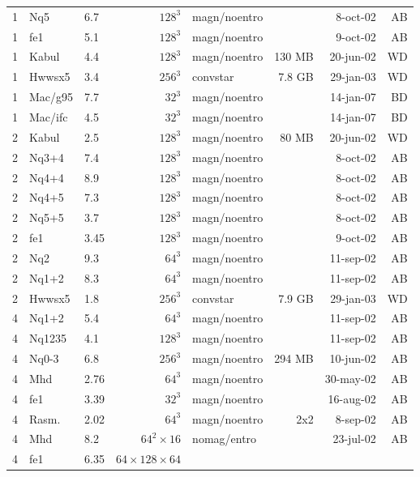 \documentclass[\mydriver,12pt,twoside,notitlepage,a4paper]{article}
\begin{document}
\begin{center}
\begin{small}
\begin{longtable}{rllrlrrr}
   1 & Nq5   & 6.7  & $128^3$ & magn/noentro &        &  8-oct-02 & AB \\
   1 & fe1   & 5.1  & $128^3$ & magn/noentro &        &  9-oct-02 & AB \\
   1 & Kabul & 4.4  & $128^3$ & magn/noentro & 130 MB & 20-jun-02 & WD \\
   1 & Hwwsx5& 3.4  & $256^3$ & convstar     & 7.8 GB & 29-jan-03 & WD \\
   1 &Mac/g95& 7.7  & $32^3$  & magn/noentro &        & 14-jan-07 & BD \\
   1 &Mac/ifc& 4.5  & $32^3$  & magn/noentro &        & 14-jan-07 & BD \\
   2 & Kabul & 2.5  & $128^3$ & magn/noentro &  80 MB & 20-jun-02 & WD \\
   2 & Nq3+4 & 7.4  & $128^3$ & magn/noentro &        &  8-oct-02 & AB \\
   2 & Nq4+4 & 8.9  & $128^3$ & magn/noentro &        &  8-oct-02 & AB \\
   2 & Nq4+5 & 7.3  & $128^3$ & magn/noentro &        &  8-oct-02 & AB \\
   2 & Nq5+5 & 3.7  & $128^3$ & magn/noentro &        &  8-oct-02 & AB \\
   2 & fe1   & 3.45 & $128^3$ & magn/noentro &        &  9-oct-02 & AB \\
   2 & Nq2   & 9.3  &  $64^3$ & magn/noentro &        & 11-sep-02 & AB \\
   2 & Nq1+2 & 8.3  &  $64^3$ & magn/noentro &        & 11-sep-02 & AB \\
   2 & Hwwsx5& 1.8  & $256^3$ & convstar     & 7.9 GB & 29-jan-03 & WD \\
   4 & Nq1+2 & 5.4  &  $64^3$ & magn/noentro &        & 11-sep-02 & AB \\
   4 & Nq1235& 4.1  & $128^3$ & magn/noentro &        & 11-sep-02 & AB \\
   4 & Nq0-3 & 6.8  & $256^3$ & magn/noentro & 294 MB & 10-jun-02 & AB \\
   4 & Mhd   & 2.76 &  $64^3$ & magn/noentro &        & 30-may-02 & AB \\
   4 & fe1   & 3.39 &  $32^3$ & magn/noentro &        & 16-aug-02 & AB \\
   4 & Rasm. & 2.02 &  $64^3$ & magn/noentro &  2x2   &  8-sep-02 & AB \\
   4 & Mhd   & 8.2  &  $64^2\!\times\!16$
                              & nomag/entro &        & 23-jul-02 & AB \\
   4 & fe1   & 6.35 &  $64\!\times\!128\!\times\!64$

\end{longtable}
\end{small}
\end{center}
\end{document}
